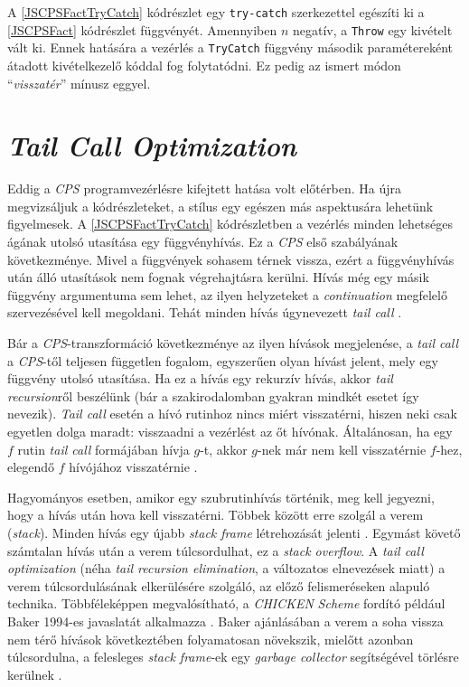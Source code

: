 A \ref{JSCPSFactTryCatch} kódrészlet egy \texttt{try-catch} szerkezettel egészíti ki a \ref{JSCPSFact} kódrészlet függvényét. Amennyiben $n$ negatív, a \texttt{Throw} egy kivételt vált ki. Ennek hatására a vezérlés a \texttt{TryCatch} függvény második paramétereként átadott kivételkezelő kóddal fog folytatódni. Ez pedig az ismert módon ``\textit{visszatér}'' mínusz eggyel.

\section{\textit{Tail Call Optimization}}

Eddig a \textit{CPS} programvezérlésre kifejtett hatása volt előtérben. Ha újra megvizsáljuk a kódrészleteket, a stílus egy egészen más aspektusára lehetünk figyelmesek. A \ref{JSCPSFactTryCatch} kódrészletben a vezérlés minden lehetséges ágának utolsó utasítása egy függvényhívás. Ez a \textit{CPS} első szabályának következménye. Mivel a függvények sohasem térnek vissza, ezért a függvényhívás után álló utasítások nem fognak végrehajtásra kerülni. Hívás még egy másik függvény argumentuma sem lehet, az ilyen helyzeteket a \textit{continuation} megfelelő szervezésével kell megoldani. Tehát minden hívás úgynevezett \textit{tail call} \cite{CompCont}.

Bár a \textit{CPS}-transzformáció következménye az ilyen hívások megjelenése, a \textit{tail call} a \textit{CPS}-től teljesen független fogalom, egyszerűen olyan hívást jelent, mely egy függvény utolsó utasítása. Ha ez a hívás egy rekurzív hívás, akkor \textit{tail recursion}ről beszélünk (bár a szakirodalomban gyakran mindkét esetet így nevezik). \textit{Tail call} esetén a hívó rutinhoz nincs miért visszatérni, hiszen neki csak egyetlen dolga maradt: visszaadni a vezérlést az őt hívónak. Általánosan, ha egy $f$ rutin \textit{tail call} formájában hívja $g$-t, akkor $g$-nek már nem kell visszatérnie $f$-hez, elegendő $f$ hívójához visszatérnie \cite{CompCont}. 

Hagyományos esetben, amikor egy szubrutinhívás történik, meg kell jegyezni, hogy a hívás után hova kell visszatérni. Többek között erre szolgál a verem (\textit{stack}). Minden hívás egy újabb \textit{stack frame} létrehozását jelenti \cite{EssProgLan}. Egymást követő számtalan hívás után a verem túlcsordulhat, ez a \textit{stack overflow}. A \textit{tail call optimization} (néha \textit{tail recursion elimination}, a változatos elnevezések miatt) a verem túlcsordulásának elkerülésére szolgáló, az előző felismeréseken alapuló technika. Többféleképpen megvalósítható, a \textit{CHICKEN} \textit{Scheme} fordító például Baker 1994-es javaslatát alkalmazza \cite{ChickenCompilation}. Baker ajánlásában a verem a soha vissza nem térő hívások következtében folyamatosan növekszik, mielőtt azonban túlcsordulna, a felesleges \textit{stack frame}-ek egy \textit{garbage collector} segítségével törlésre kerülnek \cite{CheneyOnTheMTA}.

